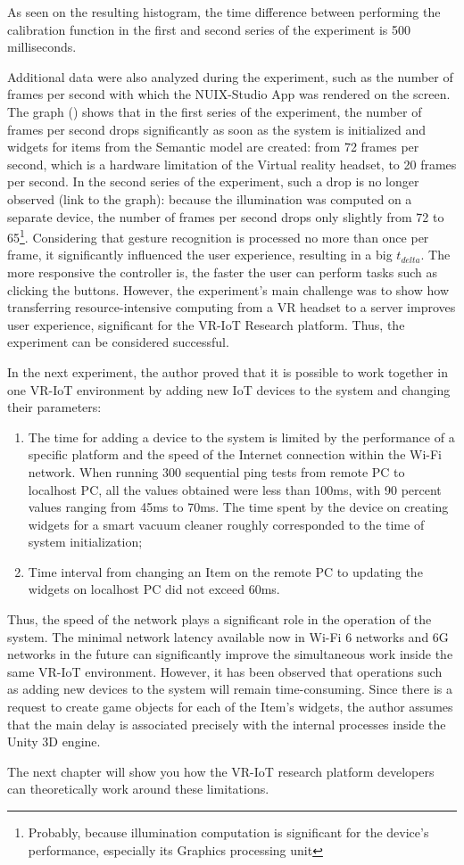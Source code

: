 As seen on the resulting histogram, the time difference between performing the calibration function in the first and second series of the experiment is 500 milliseconds.

Additional data were also analyzed during the experiment, such as the number of frames per second with which the NUIX-Studio App was rendered on the screen. The graph () shows that in the first series of the experiment, the number of frames per second drops significantly as soon as the system is initialized and widgets for items from the Semantic model are created: from 72 frames per second, which is a hardware limitation of the Virtual reality headset, to 20 frames per second. In the second series of the experiment, such a drop is no longer observed (link to the graph): because the illumination was computed on a separate device, the number of frames per second drops only slightly from 72 to 65\footnote{Probably, because illumination computation is significant for the device's performance, especially its Graphics processing unit}. Considering that gesture recognition is processed no more than once per frame, it significantly influenced the user experience, resulting in a big $t_{delta}$. The more responsive the controller is, the faster the user can perform tasks such as clicking the buttons. However, the experiment's main challenge was to show how transferring resource-intensive computing from a VR headset to a server improves user experience, significant for the VR-IoT Research platform. Thus, the experiment can be considered successful.


In the next experiment, the author proved that it is possible to work together in one VR-IoT environment by adding new IoT devices to the system and changing their parameters:
\begin{enumerate}
    \item The time for adding a device to the system is limited by the performance of a specific platform and the speed of the Internet connection within the Wi-Fi network. When running 300 sequential ping tests from remote PC to localhost PC, all the values ​​obtained were less than 100ms, with 90 percent values ​​ranging from 45ms to 70ms. The time spent by the device on creating widgets for a smart vacuum cleaner roughly corresponded to the time of system initialization;
    \item Time interval from changing an Item on the remote PC to updating the widgets on localhost PC did not exceed 60ms.
\end{enumerate}

Thus, the speed of the network plays a significant role in the operation of the system. The minimal network latency available now in Wi-Fi 6 networks and 6G networks in the future can significantly improve the simultaneous work inside the same VR-IoT environment. However, it has been observed that operations such as adding new devices to the system will remain time-consuming. Since there is a request to create game objects for each of the Item's widgets, the author assumes that the main delay is associated precisely with the internal processes inside the Unity 3D engine.

The next chapter will show you how the VR-IoT research platform developers can theoretically work around these limitations.